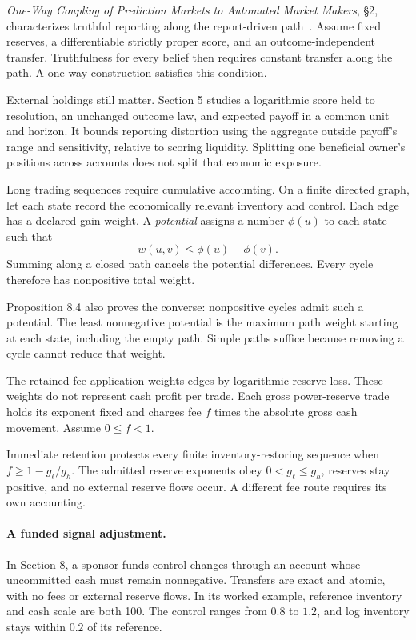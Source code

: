 \documentclass{momentum}
\begin{document}
\emph{One-Way Coupling of Prediction Markets to Automated Market Makers}, \S2, characterizes truthful reporting along the report-driven path~\cite{coupling}. Assume fixed reserves, a differentiable strictly proper score, and an outcome-independent transfer. Truthfulness for every belief then requires constant transfer along the path. A one-way construction satisfies this condition.

External holdings still matter. Section 5 studies a logarithmic score held to resolution, an unchanged outcome law, and expected payoff in a common unit and horizon. It bounds reporting distortion using the aggregate outside payoff's range and sensitivity, relative to scoring liquidity. Splitting one beneficial owner's positions across accounts does not split that economic exposure.

Long trading sequences require cumulative accounting. On a finite directed graph, let each state record the economically relevant inventory and control. Each edge has a declared gain weight. A \emph{potential} assigns a number $\phi(u)$ to each state such that
\[
w(u,v)\leq\phi(u)-\phi(v).
\]
Summing along a closed path cancels the potential differences. Every cycle therefore has nonpositive total weight.

Proposition 8.4 also proves the converse: nonpositive cycles admit such a potential. The least nonnegative potential is the maximum path weight starting at each state, including the empty path. Simple paths suffice because removing a cycle cannot reduce that weight.

The retained-fee application weights edges by logarithmic reserve loss. These weights do not represent cash profit per trade. Each gross power-reserve trade holds its exponent fixed and charges fee $f$ times the absolute gross cash movement. Assume $0\leq f<1$.

Immediate retention protects every finite inventory-restoring sequence when $f\geq1-g_\ell/g_h$. The admitted reserve exponents obey $0<g_\ell\leq g_h$, reserves stay positive, and no external reserve flows occur. A different fee route requires its own accounting.

\paragraph{A funded signal adjustment.}
In Section 8, a sponsor funds control changes through an account whose uncommitted cash must remain nonnegative. Transfers are exact and atomic, with no fees or external reserve flows. In its worked example, reference inventory and cash scale are both 100. The control ranges from $0.8$ to $1.2$, and log inventory stays within $0.2$ of its reference.
\end{document}

